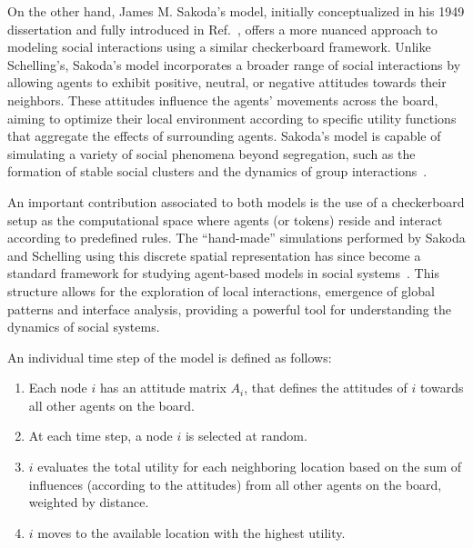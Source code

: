 On the other hand, James M. Sakoda's model, initially conceptualized in his 1949 dissertation and fully introduced in Ref.~\cite{sakoda1971checkerboard}, offers a more nuanced approach to modeling social interactions using a similar checkerboard framework. Unlike Schelling's, Sakoda's model incorporates a broader range of social interactions by allowing agents to exhibit positive, neutral, or negative attitudes towards their neighbors. These attitudes influence the agents' movements across the board, aiming to optimize their local environment according to specific utility functions that aggregate the effects of surrounding agents. Sakoda's model is capable of simulating a variety of social phenomena beyond segregation, such as the formation of stable social clusters and the dynamics of group interactions~\cite{hegselmann-2017}. 

An important contribution associated to both models is the use of a checkerboard setup as the computational space where agents (or tokens) reside and interact according to predefined rules. The ``hand-made'' simulations performed by Sakoda and Schelling using this discrete spatial representation has since become a standard framework for studying agent-based models in social systems~\cite{hegselmann-2017}. This structure allows for the exploration of local interactions, emergence of global patterns and interface analysis, providing a powerful tool for understanding the dynamics of social systems.

\begin{theorem}
    \sffamily\small
    An individual time step of the model is defined as follows:
    \begin{enumerate}
        \item Each node $i$ has an attitude matrix $A_i$, that defines the attitudes of $i$ towards all other agents on the board.
        \item At each time step, a node $i$ is selected at random.
        \item $i$ evaluates the total utility for each neighboring location based on the sum of influences (according to the attitudes) from all other agents on the board, weighted by distance.
        \item $i$ moves to the available location with the highest utility.
    \end{enumerate}
\end{theorem}

